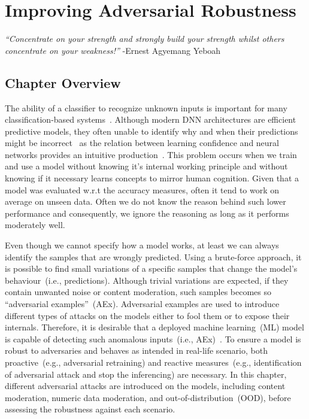 \chapter{Improving Adversarial Robustness} \label{chapter:robustness}
\textit{``Concentrate on your strength and strongly build your strength whilst others concentrate on your weakness!''} -Ernest Agyemang Yeboah 

\section{Chapter Overview}
The ability of a classifier to recognize unknown inputs is important for many classification-based systems~\cite{OOD15}. Although modern DNN architectures are efficient predictive models, they often unable to identify why and when their predictions might be incorrect~\cite{OOD3} as the relation between learning confidence and neural networks provides an intuitive production~\cite{OOD3}. This problem occurs when we train and use a model without knowing it's internal working principle and without knowing if it necessary learns concepts to mirror human cognition. Given that a model was evaluated w.r.t the accuracy measures, often it tend to work on average on unseen data. Often we do not know the reason behind such lower performance and consequently, we ignore the reasoning as long as it performs moderately well. 

\hspace*{3.5mm} Even though we cannot specify how a model works, at least we can always identify the samples that are wrongly predicted. Using a brute-force approach, it is possible to find small variations of a specific samples that change the model’s behaviour~(i.e., predictions). Although trivial variations are expected, if they contain unwanted noise or content moderation, such samples becomes so ``adversarial examples''~(AEx). Adversarial examples are used to introduce different types of attacks on the models either to fool them or to expose their internals.
Therefore, it is desirable that a deployed machine learning~(ML) model is capable of detecting such anomalous inputs~(i.e., AEx)~\cite{OOD5}. To ensure a model is robust to adversaries and behaves as intended in real-life scenario, both proactive~(e.g., adversarial retraining) and reactive measures~(e.g., identification of adversarial attack and stop the inferencing) are necessary. In this chapter, different adversarial attacks are introduced on the models, including content moderation, numeric data moderation, and out-of-distribution~(OOD), before assessing the robustness against each scenario. 

